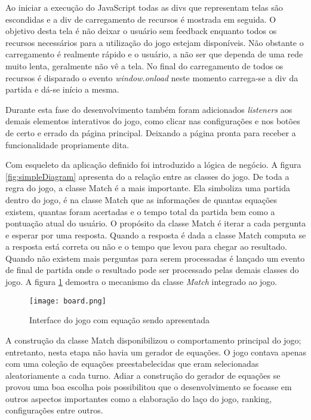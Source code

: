 Ao iniciar a execução do JavaScript todas as divs que representam
telas são escondidas e a div de carregamento de recursos é mostrada em
seguida. O objetivo desta tela é não deixar o usuário sem feedback enquanto
todos os recursos necessários para a utilização do jogo estejam disponíveis.
Não obstante o carregamento é realmente rápido e o usuário, a não ser que 
dependa de uma rede muito lenta, geralmente não vê a tela.
No final do carregamento de todos os recursos é disparado o
evento \textit{window.onload} neste momento carrega-se a div da partida
e dá-se início a mesma.

Durante esta fase do desenvolvimento também foram adicionados
\textit{listeners} aos demais elementos interativos do jogo, como
clicar nas configurações e nos botões de certo e errado da página
principal. Deixando a página  pronta para receber a funcionalidade 
propriamente dita.

Com esqueleto da aplicação definido foi introduzido a
lógica de negócio. A figura \ref{fig:simpleDiagram} apresenta do
a relação entre as classes do jogo. De toda a regra do jogo, a
classe Match é a mais importante. Ela simboliza uma partida dentro do
jogo, é na classe Match que as informações de quantas equações
existem, quantas foram acertadas e o tempo total da partida bem como
a pontuação atual do usuário. O propósito da classe Match é iterar a cada
pergunta e esperar por uma resposta. Quando a resposta é dada a classe
Match computa se a resposta está correta ou não e o tempo que levou
para chegar ao resultado. Quando não existem mais perguntas para serem
processadas é lançado um evento de final de partida onde o resultado
pode ser processado pelas demais classes do jogo.
A figura \ref{fig:gameScreen} demostra o mecanismo da classe \textit{Match} integrado
ao jogo.

\begin{figure}
    \centering
    \texttt{[image: board.png]}
	\caption{Interface do jogo com equação sendo apresentada}
    \label{fig:gameScreen}
\end{figure}

A construção da classe Match disponibilizou o comportamento principal do
jogo; entretanto, nesta etapa não havia um gerador de equações. O
jogo contava apenas com uma coleção de equações preestabelecidas
que eram selecionadas aleatoriamente a cada turno. Adiar a construção
do gerador de equações se provou uma boa escolha pois possibilitou
que o desenvolvimento se focasse em outros aspectos importantes como a
elaboração do laço do jogo, ranking, configurações entre outros.

